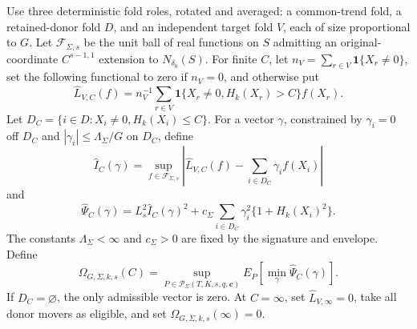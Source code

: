 Use three deterministic fold roles, rotated and averaged: a common-trend fold, a retained-donor fold \(D\), and an independent target fold \(V\), each of size proportional to \(G\). Let \(\mathcal F_{\Sigma,s}\) be the unit ball of real functions on \(S\) admitting an original-coordinate \(C^{s-1,1}\) extension to \(N_{\delta_0}(S)\). For finite \(C\), let \(n_V=\sum_{r\in V}\mathbf 1\{X_r\ne0\}\), set the following functional to zero if \(n_V=0\), and otherwise put \[\widehat L_{V,C}(f)=n_V^{-1}\sum_{r\in V}\mathbf 1\{X_r\ne0,H_k(X_r)>C\}f(X_r).\] Let \(D_C=\{i\in D:X_i\ne0,H_k(X_i)\le C\}\). For a vector \(\gamma\), constrained by \(\gamma_i=0\) off \(D_C\) and \(|\gamma_i|\le\Lambda_\Sigma/G\) on \(D_C\), define \[\widehat I_C(\gamma)=\sup_{f\in\mathcal F_{\Sigma,s}}\left|\widehat L_{V,C}(f)-\sum_{i\in D_C}\gamma_i f(X_i)\right|\] and \[\widehat\Psi_C(\gamma)=L_s^2\widehat I_C(\gamma)^2+c_\Sigma\sum_{i\in D_C}\gamma_i^2\{1+H_k(X_i)^2\}.\] The constants \(\Lambda_\Sigma<\infty\) and \(c_\Sigma>0\) are fixed by the signature and envelope. Define \[\Omega_{G,\Sigma,k,s}(C)=\sup_{P\in\mathcal P_\Sigma(T,K,s,q,\mathbf c)}E_P\!\left[\min_{\gamma}\widehat\Psi_C(\gamma)\right].\] If \(D_C=\varnothing\), the only admissible vector is zero. At \(C=\infty\), set \(\widehat L_{V,\infty}=0\), take all donor movers as eligible, and set \(\Omega_{G,\Sigma,k,s}(\infty)=0\).